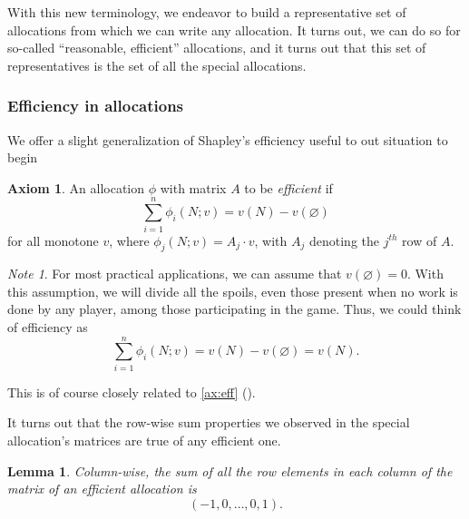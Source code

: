 \documentclass[12pt,letterpaper,final]{article}
\theoremstyle{plain}
\theoremstyle{plain}
\theoremstyle{plain}
\newtheorem{lemma}[theorem]{Lemma}
\theoremstyle{plain}
\theoremstyle{plain}
\theoremstyle{plain}
\theoremstyle{plain}
\theoremstyle{definition}
\theoremstyle{definition}
\theoremstyle{definition}
\theoremstyle{definition}
\theoremstyle{definition}
\newtheorem{axiom}{Axiom}[section]
\theoremstyle{remark}
\theoremstyle{remark}
\newtheorem*{note}{Note}
\theoremstyle{remark}
\theoremstyle{remark}
\begin{document}
With this new terminology,
we endeavor to build a representative set of allocations from which we can
write any allocation. It turns out, we can do so for so-called
``reasonable, efficient'' allocations, and it turns out that this
set of representatives  is the set of all the special allocations. 

\subsubsection{Efficiency in allocations}

We offer a slight generalization of Shapley's efficiency useful to out
situation to begin

\begin{axiom}\label{def:newEfficiency}
  An allocation \(\phi\) with matrix \(A\) to be
  \emph{efficient} if
  \[
    \sum_{i=1}^n \phi_i(N;v) = v(N) -v(\varnothing)
  \]
  for all monotone \(v\), where \(\phi_j(N;v) = A_j \cdot v\), with
  \(A_j\) denoting the \(j^{th}\) row of \(A\).
\end{axiom}

\begin{note}
  For most practical applications, we can assume that \(v(\varnothing
  )=0\). With this assumption, we will divide all the spoils, even
  those present when no work is done by any player, among those
  participating in the game. Thus, we could think of efficiency as
  \[
    \sum_{i=1}^n \phi_i(N;v) = v(N) -v(\varnothing) = v(N).
  \]
\end{note}
This is of course closely related to \cref{ax:eff} ().

It turns out that the row-wise sum properties we observed in the
special allocation's matrices are true of any efficient one.

\begin{lemma}\label{lem:rowwisesum}
  Column-wise, the sum of all the row elements in each column of the
  matrix of an
  efficient allocation is
  \[
      {\left(-1,0,\ldots,0,1\right)}.
  \]
\end{lemma}
\end{document}
